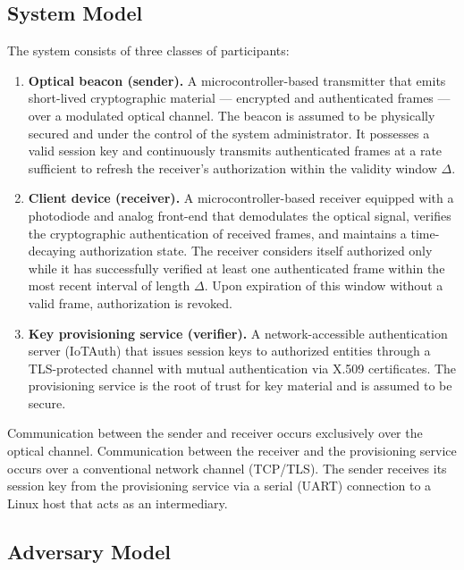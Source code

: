 \documentclass[conference]{IEEEtran}
\begin{document}
\subsection{System Model}

The system consists of three classes of participants:

\begin{enumerate}
\item \textbf{Optical beacon (sender).} A microcontroller-based transmitter that emits short-lived cryptographic material — encrypted and authenticated frames — over a modulated optical channel. The beacon is assumed to be physically secured and under the control of the system administrator. It possesses a valid session key and continuously transmits authenticated frames at a rate sufficient to refresh the receiver's authorization within the validity window $\Delta$.

\item \textbf{Client device (receiver).} A microcontroller-based receiver equipped with a photodiode and analog front-end that demodulates the optical signal, verifies the cryptographic authentication of received frames, and maintains a time-decaying authorization state. The receiver considers itself authorized only while it has successfully verified at least one authenticated frame within the most recent interval of length $\Delta$. Upon expiration of this window without a valid frame, authorization is revoked.

\item \textbf{Key provisioning service (verifier).} A network-accessible authentication server (IoTAuth) that issues session keys to authorized entities through a TLS-protected channel with mutual authentication via X.509 certificates. The provisioning service is the root of trust for key material and is assumed to be secure.
\end{enumerate}

Communication between the sender and receiver occurs exclusively over the optical channel. Communication between the receiver and the provisioning service occurs over a conventional network channel (TCP/TLS). The sender receives its session key from the provisioning service via a serial (UART) connection to a Linux host that acts as an intermediary.

\subsection{Adversary Model}
\end{document}
